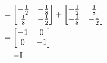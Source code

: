 \begin{solution}
\begin{align}
        &= \begin{bmatrix}-\frac{1}{2} &-\frac{1}{8}\\ \frac{1}{8} & -\frac{1}{2}\end{bmatrix} + \begin{bmatrix}-\frac{1}{2} &\frac{1}{8}\\ -\frac{1}{8} & -\frac{1}{2}\end{bmatrix}\nonumber\\
        &= \begin{bmatrix}-1 &0 \\0 &-1\end{bmatrix}\nonumber\\
        &= -\mathbb{I}\nonumber
    \end{align}
    \alignbreak
\end{solution}

